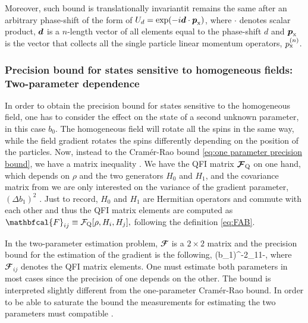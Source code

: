 Moreover, such bound is translationally invariant\ie it remains the same after an arbitrary phase-shift of the form of $U_d=\exp(-i \boldsymbol{d} \cdot \boldsymbol{p}_{\rm x})$, where $\cdot$ denotes scalar product, $\boldsymbol{d}$ is a $n$-length vector of all elements equal to the phase-shift $d$ and $\boldsymbol{p}_{\rm x}$ is the vector that collects all the single particle linear momentum operators, $p_{\rm x}^{(n)}$.

\subsubsection{Precision bound for states sensitive to homogeneous fields:
Two-parameter dependence}

In order to obtain the precision bound for states sensitive to the
homogeneous field, one has to consider the effect on the state of a second
unknown parameter, in this case $b_0$.
The homogeneous field will rotate all the spins in the same way,
while the field gradient rotates the spins
differently depending on the position of the particles.
Now, instead to the Cram\'er-Rao bound  \eqref{eq:one parameter precision bound},
we have a matrix inequality \cite{Paris2009}.
We have the QFI matrix $\boldsymbol{\mathcal{F}}_{\text{Q}}$ on one hand, which depends on $\rho$ and the two generators $H_0$ and $H_1$, and the covariance matrix from we are only interested on the variance of the gradient parameter, $(\Delta b_1)^2$ \cite{Paris2009}.
Just to record, $H_0$ and $H_1$ are Hermitian operators and commute with each other and thus the QFI matrix elements are computed as $\mathbfcal{F}_{ij}\equiv \qfi[\rho, H_i, H_j],$ following the definition \eqref{eq:FAB}.

In the two-parameter estimation problem, ${\mathbfcal{F}}$ is a $2 \times 2$ matrix and the precision bound for the estimation of the gradient is the following,
\be
\label{eq:precision bound for b1 in terms of QFI matrix elements}
(\Delta b_1)^{-2}\leq {}_{11}-,
\ee
where $\mathbfcal{F}_{ij}$ denotes the QFI matrix elements.
One must estimate both parameters in most cases since the precision of one depends on the other.
The bound is interpreted slightly different from the one-parameter Cram\'er-Rao bound.
In order to be able to saturate the bound the measurements for estimating the two parameters must compatible \cite{Paris2009}.


